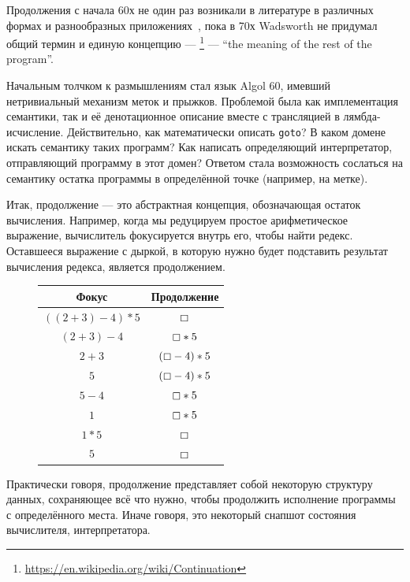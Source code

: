 
Продолжения с начала 60х не один раз возникали в литературе в различных формах и разнообразных приложениях~\cite{reynolds1993discoveries, landin1997histories}, пока в 70х Wadsworth не придумал общий термин и единую концепцию --- \footnote{\url{https://en.wikipedia.org/wiki/Continuation}} --- ``the meaning of the rest of the program''.

Начальным толчком к размышлениям стал язык Algol 60, имевший нетривиальный механизм меток и прыжков.
Проблемой была как имплементация семантики, так и её денотационное описание вместе с трансляцией в лямбда-исчисление.
Действительно, как математически описать \texttt{goto}?
В каком домене искать семантику таких программ?
Как написать определяющий интерпретатор, отправляющий программу в этот домен?
Ответом стала возможность сослаться на семантику остатка программы в определённой точке (например, на метке).

Итак, продолжение --- это абстрактная концепция, обозначающая остаток вычисления.
Например, когда мы редуцируем простое арифметическое выражение, вычислитель фокусируется внутрь его, чтобы найти редекс.
Оставшееся выражение с дыркой, в которую нужно будет подставить результат вычисления редекса, является продолжением.

\begin{figure}[h]
    \centering
    \begin{tabular}{|c|c|}
        \hline
        Фокус               & Продолжение           \\
        \hline
        $((2 + 3) - 4) * 5$ & $\boxempty$           \\
        $(2 + 3) - 4$       & $\boxempty * 5$       \\
        $2 + 3$             & $(\boxempty - 4) * 5$ \\
        $5$                 & $(\boxempty - 4) * 5$ \\
        $5 - 4$             & $\boxempty * 5$       \\
        $1$                 & $\boxempty * 5$       \\
        $1 * 5$             & $\boxempty$           \\
        $5$                 & $\boxempty$           \\
        \hline
    \end{tabular}
\end{figure}

Практически говоря, продолжение представляет собой некоторую структуру данных, сохраняющее всё что нужно, чтобы продолжить исполнение программы с определённого места.
Иначе говоря, это некоторый снапшот состояния вычислителя, интерпретатора.

